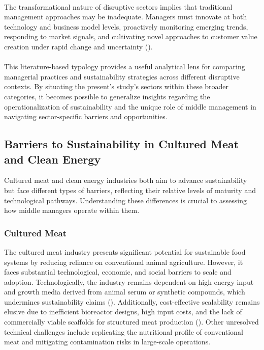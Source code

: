 	\paragraph*{} The transformational nature of disruptive sectors implies that traditional management approaches may be inadequate. Managers must innovate at both technology and business model levels, proactively monitoring emerging trends, responding to market signals, and cultivating novel approaches to customer value creation under rapid change and uncertainty (\textcite{Teece2007}).
	
	\paragraph*{} This literature-based typology provides a useful analytical lens for comparing managerial practices and sustainability strategies across different disruptive contexts. By situating the present’s study’s sectors within these broader categories, it becomes possible to generalize insights regarding the operationalization of sustainability and the unique role of middle management in navigating sector-specific barriers and opportunities. 
	
	\subsection{Barriers to Sustainability in Cultured Meat and Clean Energy}
	Cultured meat and clean energy industries both aim to advance sustainability but face different types of barriers, reflecting their relative levels of maturity and technological pathways. Understanding these differences is crucial to assessing how middle managers operate within them.
	
	\subsubsection{Cultured Meat}
	The cultured meat industry presents significant potential for sustainable food systems by reducing reliance on conventional animal agriculture. However, it faces substantial technological, economic, and social barriers to scale and adoption. Technologically, the industry remains dependent on high energy input and growth media derived from animal serum or synthetic compounds, which undermines sustainability claims (\textcite{Specht2023, Post2020}). Additionally, cost-effective scalability remains elusive due to inefficient bioreactor designs, high input costs, and the lack of commercially viable scaffolds for structured meat production (\textcite{Bodiou2020}). Other unresolved technical challenges include replicating the nutritional profile of conventional meat and mitigating contamination risks in large-scale operations.
	
